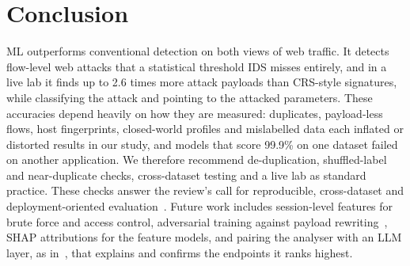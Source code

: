 \documentclass[conference]{IEEEtran}
\begin{document}
\section{Conclusion}
ML outperforms conventional detection on both views of web traffic. It detects flow-level web
attacks that a statistical threshold IDS misses entirely, and in a live lab it finds up to 2.6 times more
attack payloads than CRS-style signatures, while classifying the attack and pointing to the attacked
parameters. These accuracies depend heavily on how they are measured: duplicates, payload-less
flows, host fingerprints, closed-world profiles and mislabelled data each inflated or distorted results
in our study, and models that score 99.9\% on one dataset failed on another application. We therefore
recommend de-duplication, shuffled-label and near-duplicate checks, cross-dataset testing and a live lab
as standard practice. These checks answer the review's call for reproducible, cross-dataset and
deployment-oriented evaluation~\cite{fasla2026}. Future work includes session-level features for brute force and access control, adversarial
training against payload rewriting~\cite{floris2025}, SHAP attributions for the feature models, and
pairing the analyser with an LLM layer, as in~\cite{wang2024,khairmode2026}, that explains and confirms
the endpoints it ranks highest.
\end{document}
